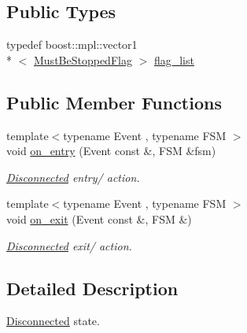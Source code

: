 \subsection*{Public Types}
\begin{DoxyCompactItemize}
\item 
typedef boost\-::mpl\-::vector1\\*
$<$ \hyperlink{structmdt_usbtmc_transfer_handler_state_machine_1_1_must_be_stopped_flag}{Must\-Be\-Stopped\-Flag} $>$ \hyperlink{structmdt_usbtmc_transfer_handler_state_machine_1_1_state_machine___1_1_disconnected_a0c9a1b57dc02aa8e3f9feb36ff15a2e2}{flag\-\_\-list}
\end{DoxyCompactItemize}
\subsection*{Public Member Functions}
\begin{DoxyCompactItemize}
\item 
{\footnotesize template$<$typename Event , typename F\-S\-M $>$ }\\void \hyperlink{structmdt_usbtmc_transfer_handler_state_machine_1_1_state_machine___1_1_disconnected_ab54d3fae0c7025e30ddaf58053b5e44c}{on\-\_\-entry} (Event const \&, F\-S\-M \&fsm)
\begin{DoxyCompactList}\small\item\em \hyperlink{structmdt_usbtmc_transfer_handler_state_machine_1_1_state_machine___1_1_disconnected}{Disconnected} entry/ action. \end{DoxyCompactList}\item 
{\footnotesize template$<$typename Event , typename F\-S\-M $>$ }\\void \hyperlink{structmdt_usbtmc_transfer_handler_state_machine_1_1_state_machine___1_1_disconnected_a15dc7564a731ece1ffe51989be8d78c2}{on\-\_\-exit} (Event const \&, F\-S\-M \&)
\begin{DoxyCompactList}\small\item\em \hyperlink{structmdt_usbtmc_transfer_handler_state_machine_1_1_state_machine___1_1_disconnected}{Disconnected} exit/ action. \end{DoxyCompactList}\end{DoxyCompactItemize}


\subsection{Detailed Description}
\hyperlink{structmdt_usbtmc_transfer_handler_state_machine_1_1_state_machine___1_1_disconnected}{Disconnected} state. 

